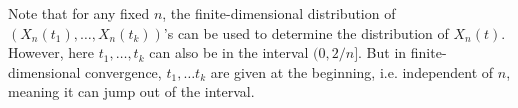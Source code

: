 \documentclass[../main/main.tex]{subfiles}
\begin{document}
Note that for any fixed $n$, the finite-dimensional distribution of $(X_n(t_1), \ldots , X_{n}(t_k))$'s can be used to determine the distribution of $X_n(t)$. However, here $t_1 , \ldots , t_k$ can also be in the interval $(0, 2 / n]$. But in finite-dimensional convergence, $t_1, \ldots t_k$ are given at the beginning, i.e. independent of $n$, meaning it can jump out of the interval.
\end{document}
